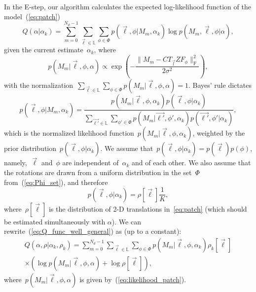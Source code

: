 \documentclass{article}
\begin{document}
In the E-step, our algorithm calculates the expected log-likelihood function of the model~(\ref{eq:patch})
\begin{equation}
\label{eq:Q_func_well_general}
Q(\alpha|\alpha_k) = \sum_{m = 0}^{N_d - 1} \sum_{\vec{\ell} \in \mathbb{L}} \sum_{\phi \in \Phi} p(\vec{\ell}, \phi|M_m, \alpha_k) \log p(M_m, \vec{\ell}, \phi|\alpha),
\end{equation}
given the current estimate~$\alpha_k$, where
\begin{equation}
\label{eq:likelihood_patch}
p(M_m|\vec{\ell}, \phi, \alpha) \propto \exp \left(- \frac{\|M_m - C T_{\vec{l}} Z F_{\phi}\|_\text{F}^2}{2 \sigma^2} \right),
\end{equation}
with the normalization~\mbox{$\sum_{\vec{\ell} \in \mathbb{L}} \sum_{\phi \in \Phi} p(M_m|\vec{\ell}, \phi, \alpha) = 1$}. Bayes' rule dictates
\begin{equation}
p(\vec{\ell}, \phi|M_m, \alpha_k) = \frac{p(M_m|\vec{\ell}, \phi, \alpha_k) p(\vec{\ell}, \phi|\alpha_k)}{\sum_{\vec{\ell'} \in \mathbb{L}} \sum_{\phi' \in \Phi} p(M_m|\vec{\ell'}, \phi', \alpha_k) p(\vec{\ell'}, \phi'|\alpha_k)},
\end{equation}
which is the normalized likelihood function~$p(M_m|\vec{\ell}, \phi, \alpha_k)$, weighted by the prior distribution~$p(\vec{\ell}, \phi| \alpha_k)$. We assume that~$p(\vec{\ell},\phi|\alpha_k)=p(\vec{\ell})p(\phi)$, namely,~$\vec{\ell}$ and~$\phi$ are independent of~$\alpha_k$ and of each other.
We also assume that the rotations are drawn from a uniform distribution in the set~$\Phi$ from~(\ref{eq:Phi_set}), and therefore
\begin{equation}
p(\vec{\ell}, \phi|\alpha_k) = \rho[\vec{\ell}] \frac{1}{K},
\end{equation}
where~$\rho[\vec{\ell}]$ is the distribution of 2-D translations in~\eqref{eq:patch} (which should be estimated simultaneously with $\alpha$). We can rewrite~(\ref{eq:Q_func_well_general}) as (up to a constant):
\begin{multline}
Q(\alpha, \rho|\alpha_k, \rho_k) = \sum_{m = 0}^{N_d - 1} \sum_{\vec{\ell} \in \mathbb{L}} \sum_{\phi \in \Phi} p(M_m|\vec{\ell}, \phi, \alpha_k) \rho_k[\vec{\ell}] \\ \times \left(\log p(M_m|\vec{\ell}, \phi, \alpha) + \log \rho[\vec{\ell}]\right),
\end{multline}
where~$p(M_m|\vec{\ell}, \phi, \alpha)$ is given by~(\ref{eq:likelihood_patch}).
\end{document}
